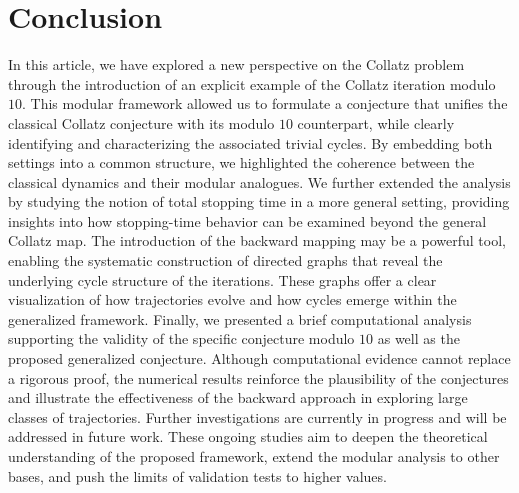 \documentclass[11pt,a4paper]{article}
\begin{document}
\section{Conclusion}
In this article, we have explored a new perspective on the Collatz problem through the introduction of an explicit example of the Collatz iteration modulo $10$. This modular framework allowed us to formulate a conjecture that unifies the classical Collatz conjecture with its modulo $10$ counterpart, while clearly identifying and characterizing the associated trivial cycles. By embedding both settings into a common structure, we highlighted the coherence between the classical dynamics and their modular analogues.
We further extended the analysis by studying the notion of total stopping time in a more general setting, providing insights into how stopping-time behavior can be examined beyond the general Collatz map. The introduction of the backward mapping may  be a powerful tool, enabling the systematic construction of directed graphs that reveal the underlying cycle structure of the iterations. These graphs offer a clear visualization of how trajectories evolve and how cycles emerge within the generalized framework.
Finally, we presented a brief computational analysis supporting the validity of the specific conjecture modulo $10$ as well as the proposed generalized conjecture. Although computational evidence cannot replace a rigorous proof, the numerical results reinforce the plausibility of the conjectures and illustrate the effectiveness of the backward approach in exploring large classes of trajectories.
Further investigations are currently in progress and will be addressed in future work. These ongoing studies aim to deepen the theoretical understanding of the proposed framework, extend the modular analysis to other bases, and push the limits of validation tests to higher values.




\end{document}

